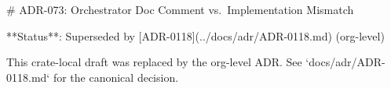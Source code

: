 # ADR-073: Orchestrator Doc Comment vs.\ Implementation Mismatch

**Status**: Superseded by [ADR-0118](../docs/adr/ADR-0118.md) (org-level)

This crate-local draft was replaced by the org-level ADR. See `docs/adr/ADR-0118.md` for the canonical decision.
